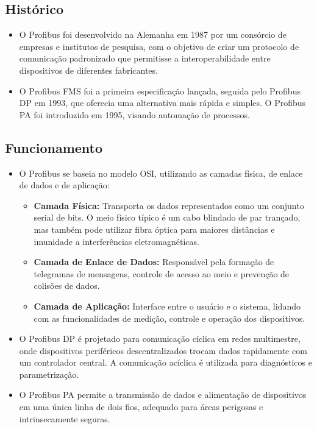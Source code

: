 \documentclass[a4paper,11pt]{article} %
\begin{document}
\subsection{Histórico}
\begin{itemize}
    \item O Profibus foi desenvolvido na Alemanha em 1987 por um consórcio de empresas e institutos de pesquisa, com o objetivo de criar um protocolo de comunicação padronizado que permitisse a interoperabilidade entre dispositivos de diferentes fabricantes.
    \item O Profibus FMS foi a primeira especificação lançada, seguida pelo Profibus DP em 1993, que oferecia uma alternativa mais rápida e simples. O Profibus PA foi introduzido em 1995, visando automação de processos.
\end{itemize}

\subsection{Funcionamento}
\begin{itemize}
    \item O Profibus se baseia no modelo OSI, utilizando as camadas física, de enlace de dados e de aplicação:
    \begin{itemize}
        \item \textbf{Camada Física:} Transporta os dados representados como um conjunto serial de bits. O meio físico típico é um cabo blindado de par trançado, mas também pode utilizar fibra óptica para maiores distâncias e imunidade a interferências eletromagnéticas.
        \item \textbf{Camada de Enlace de Dados:} Responsável pela formação de telegramas de mensagens, controle de acesso ao meio e prevenção de colisões de dados.
        \item \textbf{Camada de Aplicação:} Interface entre o usuário e o sistema, lidando com as funcionalidades de medição, controle e operação dos dispositivos.
    \end{itemize}
    \item O Profibus DP é projetado para comunicação cíclica em redes multimestre, onde dispositivos periféricos descentralizados trocam dados rapidamente com um controlador central. A comunicação acíclica é utilizada para diagnósticos e parametrização.
    \item O Profibus PA permite a transmissão de dados e alimentação de dispositivos em uma única linha de dois fios, adequado para áreas perigosas e intrinsecamente seguras.
\end{itemize}
\end{document}
